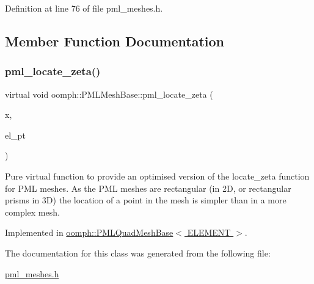 Definition at line 76 of file pml\+\_\+meshes.\+h.



\subsection{Member Function Documentation}
\mbox{\label{classoomph_1_1PMLMeshBase_a49d7e044f51a32bed758d4c16052b995}} 
\subsubsection{\texorpdfstring{pml\+\_\+locate\+\_\+zeta()}{pml\_locate\_zeta()}}
{\footnotesize\ttfamily virtual void oomph\+::\+P\+M\+L\+Mesh\+Base\+::pml\+\_\+locate\+\_\+zeta (\begin{DoxyParamCaption}\item[{const \hyperlink{classoomph_1_1Vector}{Vector}$<$ double $>$ \&}]{x,  }\item[{\hyperlink{classoomph_1_1FiniteElement}{Finite\+Element} $\ast$\&}]{el\+\_\+pt }\end{DoxyParamCaption})\hspace{0.3cm}{\ttfamily [pure virtual]}}



Pure virtual function to provide an optimised version of the locate\+\_\+zeta function for P\+ML meshes. As the P\+ML meshes are rectangular (in 2D, or rectangular prisms in 3D) the location of a point in the mesh is simpler than in a more complex mesh. 



Implemented in \hyperlink{classoomph_1_1PMLQuadMeshBase_a8054b13b65a898e1364ca30eace6c1e8}{oomph\+::\+P\+M\+L\+Quad\+Mesh\+Base$<$ E\+L\+E\+M\+E\+N\+T $>$}.



The documentation for this class was generated from the following file\+:\begin{DoxyCompactItemize}
\item 
\hyperlink{pml__meshes_8h}{pml\+\_\+meshes.\+h}\end{DoxyCompactItemize}
